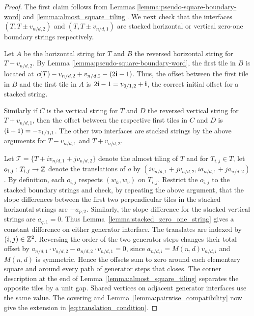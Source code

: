 \documentclass[12pt]{amsart}
\begin{document}
\begin{proof}
The first claim follows from Lemmas \ref{lemma:pseudo-square-boundary-word} and \ref{lemma:almost_square_tiling}.  We next check that the interfaces $(T, T \pm v_{n/d,2})$ and $(T, T \pm v_{n/d, 1})$ are stacked horizontal or vertical zero-one boundary strings respectively. 

Let $A$ be the horizontal string for $T$ and $B$ the reversed horizontal string for 
$T - v_{n/d, 2}$.  By Lemma \ref{lemma:pseudo-square-boundary-word}, the first tile in $B$ is located at $c(T) - v_{n/d,2} + v_{n/d,2} - (2 \mathbf{i} - 1)$. Thus, the offset between the first tile in $B$ and the first tile in $A$ is $2 \mathbf{i} - 1 = v_{0/1,2} + \mathbf{i}$, the correct
initial offset for a stacked string. 

Similarly if $C$ is the vertical string for $T$ and $D$ the reversed vertical string for $T + v_{n/d,1}$, then 
the offset between the respective first tiles in $C$ and $D$ is $(\mathbf{i}+1) = -v_{1/1,1}$. The other two interfaces are stacked strings by the above arguments for $T - v_{n/d,1}$ and $T + v_{n/d,2}$.  

Let $\mathcal{T} = \{ T + i v_{n/d, 1} + j v_{n/d,2}\} $ denote the almost tiling of $T$ and for $T_{i,j} \in T$, let 
$o_{i,j}:T_{i,j} \to \mathbb{Z}$ denote the translations of $o$ by $(i v_{n/d,1} + j v_{n/d,2}, i a_{n/d,1} + j a_{n/d, 2})$.
By definition, each $o_{i,j}$ respects $(w_h,w_v)$ on $T_{i,j}$. Restrict the $o_{i,j}$ to 
the stacked boundary strings and check, by repeating the above argument, that the slope differences between the first two perpendicular tiles in the stacked horizontal strings are $-a_{p,2}$. Similarly, the slope difference for the stacked vertical strings are $a_{q,1} = 0$.
Thus Lemma~\ref{lemma:stacked_zero_one_string} gives a constant difference on either generator interface. The translates are indexed by $(i,j)\in\mathbb{Z}^2$. Reversing the order of the two generator steps changes their total offset by $a_{n/d,1}\cdot v_{n/d,2}-a_{n/d,2}\cdot v_{n/d,1}=0$, since $a_{n/d,i}=M(n,d)v_{n/d,i}$ and $M(n,d)$ is symmetric. Hence the offsets sum to zero around each elementary square and around every path of generator steps that closes. The corner description at the end of Lemma~\ref{lemma:almost_square_tiling} separates the opposite tiles by a unit gap. Shared vertices on adjacent generator interfaces use the same value. The covering and Lemma~\ref{lemma:pairwise_compatibility} now give the extension in \eqref{eq:translation_condition}.
\end{proof}
\end{document}

